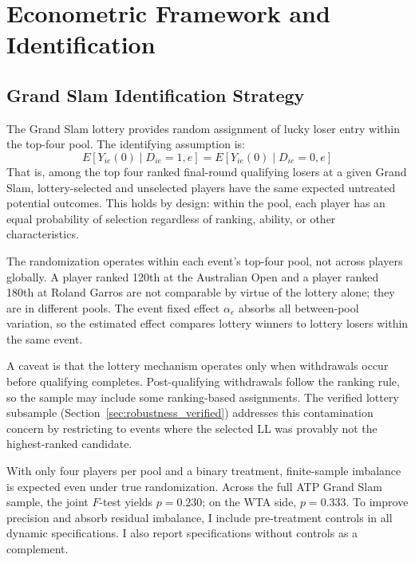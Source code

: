 \section{Econometric Framework and Identification}
\label{sec:strategy}

\subsection{Grand Slam Identification Strategy}
\label{sec:strategy_gs}

The Grand Slam lottery provides random assignment of lucky loser entry within the top-four pool. The identifying assumption is:
\[
E[Y_{ie}(0) \mid D_{ie}=1, e] = E[Y_{ie}(0) \mid D_{ie}=0, e]
\]
That is, among the top four ranked final-round qualifying losers at a given Grand Slam, lottery-selected and unselected players have the same expected untreated potential outcomes. This holds by design: within the pool, each player has an equal probability of selection regardless of ranking, ability, or other characteristics.

The randomization operates within each event's top-four pool, not across players globally. A player ranked 120th at the Australian Open and a player ranked 180th at Roland Garros are not comparable by virtue of the lottery alone; they are in different pools. The event fixed effect $\alpha_e$ absorbs all between-pool variation, so the estimated effect compares lottery winners to lottery losers within the same event.

A caveat is that the lottery mechanism operates only when withdrawals occur before qualifying completes. Post-qualifying withdrawals follow the ranking rule, so the sample may include some ranking-based assignments. The verified lottery subsample (Section~\ref{sec:robustness_verified}) addresses this contamination concern by restricting to events where the selected LL was provably not the highest-ranked candidate.

With only four players per pool and a binary treatment, finite-sample imbalance is expected even under true randomization. Across the full ATP Grand Slam sample, the joint $F$-test yields $p = 0.230$; on the WTA side, $p = 0.333$. To improve precision and absorb residual imbalance, I include pre-treatment controls in all dynamic specifications. I also report specifications without controls as a complement.

